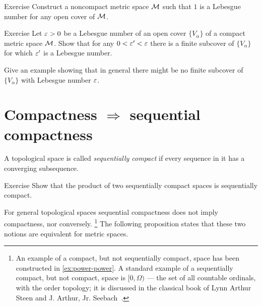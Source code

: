 
\begin{thm}{Exercise}\label{ex:lebesgue=1}
Construct a noncompact metric space $\mathcal{M}$ such that $1$ is a Lebesgue number for any open cover of $\mathcal{M}$.
\end{thm}

\begin{thm}{Exercise}\label{ex:lebesgue-opt}
Let $\varepsilon>0$ be a Lebesgue number of an open cover $\{V_\alpha\}$ of a compact metric space $\mathcal{M}$.
Show that for any $0<\varepsilon'<\varepsilon$ there is a finite subcover of $\{V_\alpha\}$ for which $\varepsilon'$ is a Lebesgue number.

Give an example showing that in general there might be no finite subcover of $\{V_\alpha\}$ with Lebesgue number $\varepsilon$.
\end{thm}


\section[\texorpdfstring{Compactness $\Rightarrow$ sequential compactness}{Compactness ⇒ sequential compactness}]{Compactness $\bm{\Rightarrow}$ sequential compactness}\label{sec:comp=>seq-comp}

A topological space is called \emph{sequentially compact} if every sequence in it has a converging subsequence.

{\sloppy

\begin{thm}{Exercise}\label{ex:product-sequentially-compact}
Show that the product of two sequentially compact spaces is sequentially compact.
\end{thm}

}

For general topological spaces sequential compactness does not imply compactness, nor conversely.%
\footnote{An example of a compact, but not sequentially compact, space has been constructed in \ref{ex:power-power}.
A standard example of a sequentially compact, but not compact, space is $[0,\Omega)$ --- the set of all countable ordinals, with the order topology;
it is discussed in the classical book of Lynn Arthur Steen and J. Arthur, Jr. Seebach~\cite{steen-seebach}.
}
The following proposition states that these two notions are equivalent for metric spaces.

